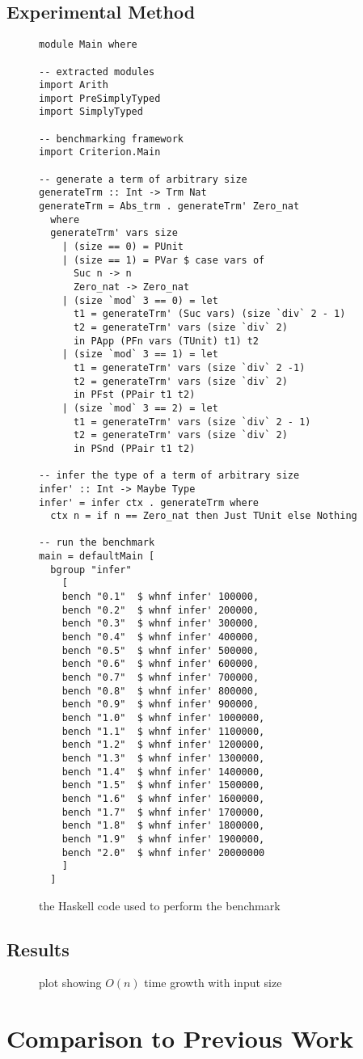 \subsection{Experimental Method}
\begin{figure}
\begin{verbatim}
module Main where

-- extracted modules
import Arith
import PreSimplyTyped
import SimplyTyped

-- benchmarking framework
import Criterion.Main

-- generate a term of arbitrary size
generateTrm :: Int -> Trm Nat
generateTrm = Abs_trm . generateTrm' Zero_nat
  where
  generateTrm' vars size
    | (size == 0) = PUnit
    | (size == 1) = PVar $ case vars of
      Suc n -> n
      Zero_nat -> Zero_nat
    | (size `mod` 3 == 0) = let
      t1 = generateTrm' (Suc vars) (size `div` 2 - 1)
      t2 = generateTrm' vars (size `div` 2)
      in PApp (PFn vars (TUnit) t1) t2 
    | (size `mod` 3 == 1) = let
      t1 = generateTrm' vars (size `div` 2 -1)
      t2 = generateTrm' vars (size `div` 2)
      in PFst (PPair t1 t2)
    | (size `mod` 3 == 2) = let
      t1 = generateTrm' vars (size `div` 2 - 1)
      t2 = generateTrm' vars (size `div` 2)
      in PSnd (PPair t1 t2)

-- infer the type of a term of arbitrary size
infer' :: Int -> Maybe Type
infer' = infer ctx . generateTrm where
  ctx n = if n == Zero_nat then Just TUnit else Nothing

-- run the benchmark
main = defaultMain [
  bgroup "infer"
    [
    bench "0.1"  $ whnf infer' 100000,
    bench "0.2"  $ whnf infer' 200000,
    bench "0.3"  $ whnf infer' 300000,
    bench "0.4"  $ whnf infer' 400000,
    bench "0.5"  $ whnf infer' 500000,
    bench "0.6"  $ whnf infer' 600000,
    bench "0.7"  $ whnf infer' 700000,
    bench "0.8"  $ whnf infer' 800000,
    bench "0.9"  $ whnf infer' 900000,
    bench "1.0"  $ whnf infer' 1000000,
    bench "1.1"  $ whnf infer' 1100000,
    bench "1.2"  $ whnf infer' 1200000,
    bench "1.3"  $ whnf infer' 1300000,
    bench "1.4"  $ whnf infer' 1400000,
    bench "1.5"  $ whnf infer' 1500000,
    bench "1.6"  $ whnf infer' 1600000,
    bench "1.7"  $ whnf infer' 1700000,
    bench "1.8"  $ whnf infer' 1800000,
    bench "1.9"  $ whnf infer' 1900000,
    bench "2.0"  $ whnf infer' 20000000
    ]
  ]
\end{verbatim}
\caption{the Haskell code used to perform the benchmark}
\label{fig:benchmark-code}
\end{figure}

\subsection{Results}
\begin{figure}
\centering

\label{fig:asymptotic-plot}
\caption{plot showing \(O(n)\) time growth with input size}
\end{figure}

\section{Comparison to Previous Work}
\cite{head-to-head-comparison}
